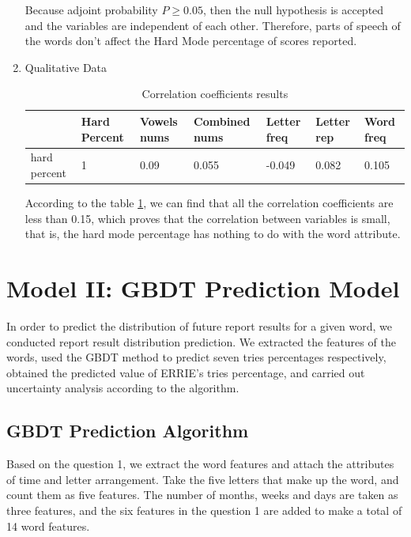 \documentclass[
  journal=medium,
  manuscript=Report,
  year=2023,
  volume=37,
]{cup-journal}
\begin{document}
\begin{enumerate}
    Because adjoint probability $P \geq 0.05$, then the null hypothesis is accepted and the variables are independent of each other. Therefore, parts of speech of the words don’t affect the Hard Mode percentage of scores reported. 

    \item  Qualitative Data
    \begin{table}[hbt!]
        \begin{threeparttable}
        \caption{Correlation coefficients results}
        \label{Correlation coefficients results}
        \begin{tabular}{lllllll}
        \toprule
        \headrow & Hard Percent & Vowels nums & Combined nums & Letter freq & Letter rep & Word freq\\ 
        \midrule
        hard percent  & 1 & 0.09 & 0.055 & -0.049 & 0.082 & 0.105 \\ 
        \bottomrule 
        \end{tabular}
        \end{threeparttable}
    \end{table}

    According to the table \ref{Correlation coefficients results}, we can find that all the correlation coefficients are less than 0.15, which proves that the correlation between variables is small, that is, the hard mode percentage has nothing to do with the word attribute.
\end{enumerate}

\section{Model II: GBDT Prediction Model}

In order to predict the distribution of future report results for a given word, we conducted report result distribution prediction. We extracted the features of the words, used the GBDT method to predict seven tries percentages respectively, obtained the predicted value of ERRIE's tries percentage, and carried out uncertainty analysis according to the algorithm.

\subsection{GBDT Prediction Algorithm}

Based on the question 1, we extract the word features and attach the attributes of time and letter arrangement. Take the five letters that make up the word, and count them as five features. The number of months, weeks and days are taken as three features, and the six features in the question 1 are added to make a total of 14 word features. 
\end{document}
